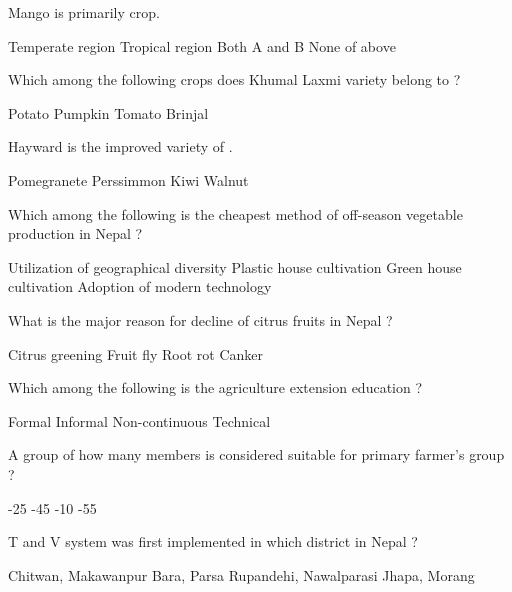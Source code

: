 \begin{questions}
\question Mango is primarily \fillin[][3cm] crop.
  \begin{choices}
  \choice Temperate region
  \choice Tropical region
  \choice Both A and B
  \choice None of above
  \end{choices}

\question Which among the following crops does Khumal Laxmi variety belong to ?
  \begin{choices}
  \CorrectChoice Potato
  \choice Pumpkin
  \choice Tomato
  \choice Brinjal
  \end{choices}

\question Hayward is the improved variety of \fillin[][3cm].
  \begin{choices}
  \choice Pomegranete
  \choice Perssimmon
  \CorrectChoice Kiwi
  \choice Walnut
  \end{choices}

\question Which among the following is the cheapest method of off-season vegetable production in Nepal ?
  \begin{choices}
  \choice Utilization of geographical diversity
  \choice Plastic house cultivation
  \choice Green house cultivation
  \choice Adoption of modern technology
  \end{choices}

\question What is the major reason for decline of citrus fruits in Nepal ?
  \begin{choices}
  \choice Citrus greening
  \choice Fruit fly
  \choice Root rot
  \choice Canker
  \end{choices}

\question Which among the following is the agriculture extension education ?
  \begin{choices}
  \choice Formal
  \choice Informal
  \choice Non-continuous
  \choice Technical
  \end{choices}

\question A group of how many members is considered suitable for primary farmer's group ?
  \begin{choices}
  -25
  -45
  -10
  -55
  \end{choices}

\question T and V system was first implemented in which district in Nepal ?
  \begin{choices}
  \choice Chitwan, Makawanpur
  \choice Bara, Parsa
  \choice Rupandehi, Nawalparasi
  \choice Jhapa, Morang
  \end{choices}


\end{questions}
